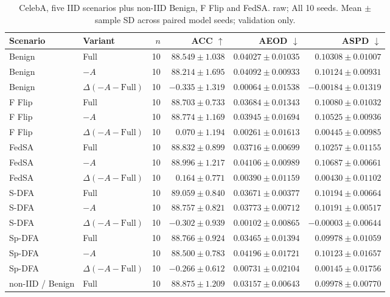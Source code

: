 \begin{table}[t]
\centering
\small
\caption{CelebA, five IID scenarios plus non-IID Benign, F Flip and FedSA. raw; All 10 seeds. Mean $\pm$ sample SD across paired model seeds; validation only.}
\begin{tabular}{llrrrr}
\toprule
Scenario & Variant & $n$ & ACC $\uparrow$ & AEOD $\downarrow$ & ASPD $\downarrow$ \\
\midrule
Benign & Full & 10 & $88.549 \pm 1.038$ & $0.04027 \pm 0.01035$ & $0.10308 \pm 0.01007$ \\
Benign & $-A$ & 10 & $88.214 \pm 1.695$ & $0.04092 \pm 0.00933$ & $0.10124 \pm 0.00931$ \\
Benign & $\Delta(-A-\mathrm{Full})$ & 10 & $-0.335 \pm 1.319$ & $0.00064 \pm 0.01538$ & $-0.00184 \pm 0.01319$ \\
F Flip & Full & 10 & $88.703 \pm 0.733$ & $0.03684 \pm 0.01343$ & $0.10080 \pm 0.01032$ \\
F Flip & $-A$ & 10 & $88.774 \pm 1.169$ & $0.03945 \pm 0.01694$ & $0.10525 \pm 0.00936$ \\
F Flip & $\Delta(-A-\mathrm{Full})$ & 10 & $0.070 \pm 1.194$ & $0.00261 \pm 0.01613$ & $0.00445 \pm 0.00985$ \\
FedSA & Full & 10 & $88.832 \pm 0.899$ & $0.03716 \pm 0.00699$ & $0.10257 \pm 0.01155$ \\
FedSA & $-A$ & 10 & $88.996 \pm 1.217$ & $0.04106 \pm 0.00989$ & $0.10687 \pm 0.00661$ \\
FedSA & $\Delta(-A-\mathrm{Full})$ & 10 & $0.164 \pm 0.771$ & $0.00390 \pm 0.01159$ & $0.00430 \pm 0.01102$ \\
S-DFA & Full & 10 & $89.059 \pm 0.840$ & $0.03671 \pm 0.00377$ & $0.10194 \pm 0.00664$ \\
S-DFA & $-A$ & 10 & $88.757 \pm 0.821$ & $0.03773 \pm 0.00712$ & $0.10191 \pm 0.00517$ \\
S-DFA & $\Delta(-A-\mathrm{Full})$ & 10 & $-0.302 \pm 0.939$ & $0.00102 \pm 0.00865$ & $-0.00003 \pm 0.00644$ \\
Sp-DFA & Full & 10 & $88.766 \pm 0.924$ & $0.03465 \pm 0.01394$ & $0.09978 \pm 0.01059$ \\
Sp-DFA & $-A$ & 10 & $88.500 \pm 0.783$ & $0.04196 \pm 0.01721$ & $0.10123 \pm 0.01657$ \\
Sp-DFA & $\Delta(-A-\mathrm{Full})$ & 10 & $-0.266 \pm 0.612$ & $0.00731 \pm 0.02104$ & $0.00145 \pm 0.01756$ \\
non-IID / Benign & Full & 10 & $88.875 \pm 1.209$ & $0.03157 \pm 0.00643$ & $0.09978 \pm 0.00770$ \\

\end{tabular}
\end{table}
